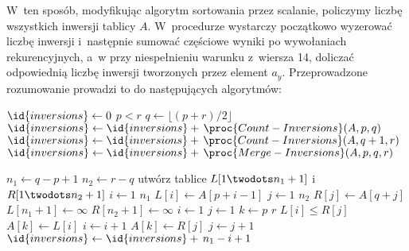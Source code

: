 W~ten sposób, modyfikując algorytm sortowania przez scalanie, policzymy liczbę wszystkich inwersji tablicy $A$. W~procedurze  wystarczy początkowo wyzerować liczbę inwersji i~następnie sumować częściowe wyniki po wywołaniach rekurencyjnych, a~w  przy niespełnieniu warunku z~wiersza 14, doliczać odpowiednią liczbę inwersji tworzonych przez element $a_y$. Przeprowadzone rozumowanie prowadzi to do następujących algorytmów:

\begin{codebox}
\li	$\id{inversions}\gets0$
\li	\If $p<r$
\li		\Then
			$q\gets\lfloor(p+r)/2\rfloor$
\li			$\id{inversions}\gets\id{inversions}+\,\proc{Count-Inversions}(A,p,q)$
\li			$\id{inversions}\gets\id{inversions}+\,\proc{Count-Inversions}(A,q+1,r)$
\li			$\id{inversions}\gets\id{inversions}+\,\proc{Merge-Inversions}(A,p,q,r)$
		\End
\li	\Return{}
\end{codebox}

\begin{codebox}
\li	$n_1\gets q-p+1$
\li	$n_2\gets r-q$
\li	utwórz tablice $L[1\twodots n_1+1]$ i~$R[1\twodots n_2+1]$
\li	\For $i\gets1$ \To $n_1$
\li		\Do
			$L[i]\gets A[p+i-1]$
		\End
\li	\For $j\gets1$ \To $n_2$
\li		\Do
			$R[j]\gets A[q+j]$
		\End
\li	$L[n_1+1]\gets\infty$
\li	$R[n_2+1]\gets\infty$
\li	$i\gets1$
\li	$j\gets1$
\li	\For $k\gets p$ \To $r$
\li		\Do
\li			\If $L[i]\le R[j]$
\li				\Then
					$A[k]\gets L[i]$
\li					$i\gets i+1$
\li				\Else
					$A[k]\gets R[j]$
\li					$j\gets j+1$
\li					$\id{inversions}\gets\id{inversions}+\,n_1-i+1$
				\End
		\End
\li	\Return{}
\end{codebox}
